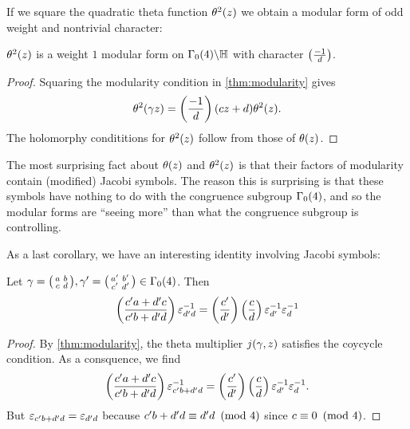 \documentclass[12pt,reqno,oneside]{amsart}
\begin{document}
    If we square the quadratic theta function $\theta^{2}(z)$ we obtain a modular form of odd weight and nontrivial character:

    \begin{corollary}
        $\theta^{2}(z)$ is a weight $1$ modular form on $\Gamma_{0}(4)\backslash\mathbb{H}$ with character $\textstyle{\left(\frac{-1}{d}\right)}$.
    \end{corollary}
    \begin{proof}
        Squaring the modularity condition in \cref{thm:modularity} gives
        \[
            \theta^{2}(\gamma z) = \left(\frac{-1}{d}\right)(cz+d)\theta^{2}(z).
        \]
        The holomorphy condititions for $\theta^{2}(z)$ follow from those of $\theta(z)$.
    \end{proof}
    
    The most surprising fact about $\theta(z)$ and $\theta^{2}(z)$ is that their factors of modularity contain (modified) Jacobi symbols. The reason this is surprising is that these symbols have nothing to do with the congruence subgroup $\Gamma_{0}(4)$, and so the modular forms are ``seeing more'' than what the congruence subgroup is controlling.
    
    As a last corollary, we have an interesting identity involving Jacobi symbols:

    \begin{corollary}
    Let $\gamma = \begin{psmallmatrix} a & b \\ c & d \end{psmallmatrix},\gamma' = \begin{psmallmatrix} a' & b' \\ c' & d' \end{psmallmatrix} \in \Gamma_{0}(4)$. Then
    \[
        \left(\frac{c'a+d'c}{c'b+d'd}\right)\varepsilon_{d'd}^{-1} = \left(\frac{c'}{d'}\right)\left(\frac{c}{d}\right)\varepsilon_{d'}^{-1}\varepsilon_{d}^{-1}
    \]
    \end{corollary}
    \begin{proof}
    By \cref{thm:modularity}, the theta multiplier $j(\gamma,z)$ satisfies the coycycle condition. As a consquence, we find
    \[
        \left(\frac{c'a+d'c}{c'b+d'd}\right)\varepsilon_{c'b+d'd}^{-1} = \left(\frac{c'}{d'}\right)\left(\frac{c}{d}\right)\varepsilon_{d'}^{-1}\varepsilon_{d}^{-1}.
    \]
    But $\varepsilon_{c'b+d'd} = \varepsilon_{d'd}$ because $c'b+d'd \equiv d'd \ \left(\text{mod }4\right)$ since $c \equiv 0 \ \left(\text{mod }4\right)$.
    \end{proof}
\end{document}

